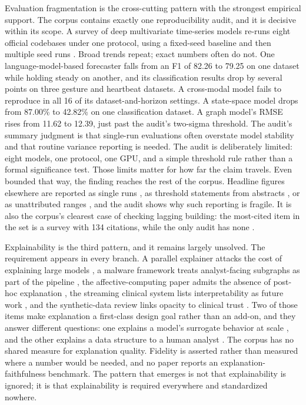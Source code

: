 \documentclass[pdflatex,sn-basic,Numbered]{sn-jnl}%
\begin{document}
Evaluation fragmentation is the cross-cutting pattern with the strongest empirical support. The corpus contains exactly one reproducibility audit, and it is decisive within its scope. A survey of deep multivariate time-series models re-runs eight official codebases under one protocol, using a fixed-seed baseline and then multiple seed runs \citep{vats2026survey}. Broad trends repeat; exact numbers often do not. One language-model-based forecaster falls from an F1 of 82.26 to 79.25 on one dataset while holding steady on another, and its classification results drop by several points on three gesture and heartbeat datasets. A cross-modal model fails to reproduce in all 16 of its dataset-and-horizon settings. A state-space model drops from 87.00\% to 42.82\% on one classification dataset. A graph model's RMSE rises from 11.62 to 12.39, just past the audit's two-sigma threshold. The audit's summary judgment is that single-run evaluations often overstate model stability and that routine variance reporting is needed. The audit is deliberately limited: eight models, one protocol, one GPU, and a simple threshold rule rather than a formal significance test. Those limits matter for how far the claim travels. Even bounded that way, the finding reaches the rest of the corpus. Headline figures elsewhere are reported as single runs \citep{xiao2025katn}, as threshold statements from abstracts \citep{gunbilek2026enhanced}, or as unattributed ranges \citep{edozie2025telecom}, and the audit shows why such reporting is fragile. It is also the corpus's clearest case of checking lagging building: the most-cited item in the set is a survey with 134 citations, while the only audit has none \citep{vats2026survey}.

Explainability is the third pattern, and it remains largely unsolved. The requirement appears in every branch. A parallel explainer attacks the cost of explaining large models \citep{jiang2026pexp}, a malware framework treats analyst-facing subgraphs as part of the pipeline \citep{mohammadian2025explainable}, the affective-computing paper admits the absence of post-hoc explanation \citep{wafa2025advancing}, the streaming clinical system lists interpretability as future work \citep{saleh2025cloud}, and the synthetic-data review links opacity to clinical trust \citep{waseem2025synthetic}. Two of those items make explanation a first-class design goal rather than an add-on, and they answer different questions: one explains a model's surrogate behavior at scale \citep{jiang2026pexp}, and the other explains a data structure to a human analyst \citep{mohammadian2025explainable}. The corpus has no shared measure for explanation quality. Fidelity is asserted rather than measured where a number would be needed, and no paper reports an explanation-faithfulness benchmark. The pattern that emerges is not that explainability is ignored; it is that explainability is required everywhere and standardized nowhere.
\end{document}
